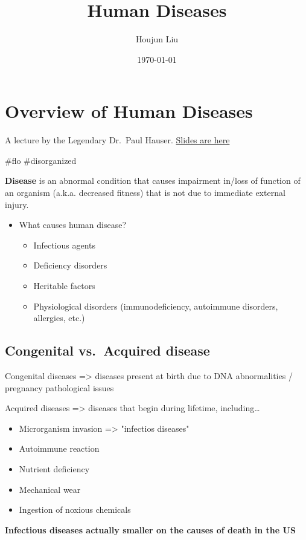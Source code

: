 \documentclass[letterpaper]{article}
\author{Houjun Liu}
\date{\today}
\title{Human Diseases}
\renewcommand{\tableofcontents}{}
\begin{document}
\tableofcontents



\section{Overview of Human Diseases}
\label{sec:org831e011}
A lecture by the Legendary Dr. Paul Hauser.
\href{https://docs.google.com/presentation/d/1b2RetU6iGsd\_h4Msb2SV-\_WznNXSREbsPpfdY-LgJZs/edit\#slide=id.ga6d683dbbf\_0\_338}{Slides
are here}

\#flo \#disorganized

\textbf{Disease} is an abnormal condition that causes impairment in/loss of
function of an organism (a.k.a. decreased fitness) that is not due to
immediate external injury.

\begin{itemize}
\item What causes human disease?

\begin{itemize}
\item Infectious agents
\item Deficiency disorders
\item Heritable factors
\item Physiological disorders (immunodeficiency, autoimmune disorders,
allergies, etc.)
\end{itemize}
\end{itemize}

\subsection{Congenital vs. Acquired disease}
\label{sec:org564ac9e}
Congenital diseases => diseases present at birth due to DNA
abnormalities / pregnancy pathological issues

Acquired diseases => diseases that begin during lifetime, including\ldots{}

\begin{itemize}
\item Microrganism invasion => "infectios diseases"
\item Autoimmune reaction
\item Nutrient deficiency
\item Mechanical wear
\item Ingestion of noxious chemicals
\end{itemize}

\textbf{Infectious diseases actually smaller on the causes of death in the US}
\end{document}
